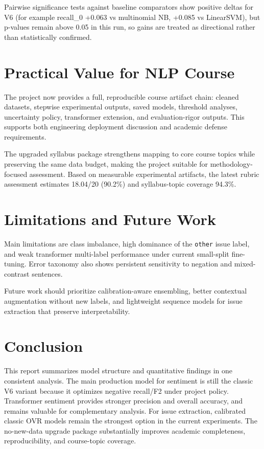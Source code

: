 \documentclass[12pt,a4paper]{article}
\begin{document}
Pairwise significance tests against baseline comparators show positive deltas for V6 (for example recall\_0 +0.063 vs multinomial NB, +0.085 vs LinearSVM), but p-values remain above 0.05 in this run, so gains are treated as directional rather than statistically confirmed.

\section{Practical Value for NLP Course}
The project now provides a full, reproducible course artifact chain: cleaned datasets, stepwise experimental outputs, saved models, threshold analyses, uncertainty policy, transformer extension, and evaluation-rigor outputs. This supports both engineering deployment discussion and academic defense requirements.

The upgraded syllabus package strengthens mapping to core course topics while preserving the same data budget, making the project suitable for methodology-focused assessment. Based on measurable experimental artifacts, the latest rubric assessment estimates 18.04/20 (90.2\%) and syllabus-topic coverage 94.3\%.

\section{Limitations and Future Work}
Main limitations are class imbalance, high dominance of the \texttt{other} issue label, and weak transformer multi-label performance under current small-split fine-tuning. Error taxonomy also shows persistent sensitivity to negation and mixed-contrast sentences.

Future work should prioritize calibration-aware ensembling, better contextual augmentation without new labels, and lightweight sequence models for issue extraction that preserve interpretability.

\section{Conclusion}
This report summarizes model structure and quantitative findings in one consistent analysis. The main production model for sentiment is still the classic V6 variant because it optimizes negative recall/F2 under project policy. Transformer sentiment provides stronger precision and overall accuracy, and remains valuable for complementary analysis. For issue extraction, calibrated classic OVR models remain the strongest option in the current experiments. The no-new-data upgrade package substantially improves academic completeness, reproducibility, and course-topic coverage.
\end{document}
